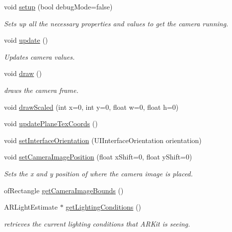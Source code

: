 \begin{DoxyCompactItemize}
void \mbox{\hyperlink{class_a_r_core_1_1_a_r_cam_a5abe4cdd0ae36986899afaeae16c6bf2}{setup}} (bool debug\+Mode=false)
\begin{DoxyCompactList}\small\item\em Sets up all the necessary properties and values to get the camera running. \end{DoxyCompactList}\item 
void \mbox{\hyperlink{class_a_r_core_1_1_a_r_cam_a900296e2ff23dfa7deb8bfab58fd0729}{update}} ()
\begin{DoxyCompactList}\small\item\em Updates camera values. \end{DoxyCompactList}\item 
void \mbox{\hyperlink{class_a_r_core_1_1_a_r_cam_ac6506992ee88e0acd20d851849ebfa18}{draw}} ()
\begin{DoxyCompactList}\small\item\em draws the camera frame. \end{DoxyCompactList}\item 
void \mbox{\hyperlink{class_a_r_core_1_1_a_r_cam_a5512aeae7ea9edb7daf9c9c07d15d402}{draw\+Scaled}} (int x=0, int y=0, float w=0, float h=0)
\item 
void \mbox{\hyperlink{class_a_r_core_1_1_a_r_cam_a577095ff1d35c84708f578d07df5ac33}{update\+Plane\+Tex\+Coords}} ()
\item 
void \mbox{\hyperlink{class_a_r_core_1_1_a_r_cam_ab4af1b504437a61f5ecec331ad2bd52c}{set\+Interface\+Orientation}} (U\+I\+Interface\+Orientation orientation)
\item 
void \mbox{\hyperlink{class_a_r_core_1_1_a_r_cam_ae287390a140e20f856c44988f706efa5}{set\+Camera\+Image\+Position}} (float x\+Shift=0, float y\+Shift=0)
\begin{DoxyCompactList}\small\item\em Sets the x and y position of where the camera image is placed. \end{DoxyCompactList}\item 
of\+Rectangle \mbox{\hyperlink{class_a_r_core_1_1_a_r_cam_abd6a08f527d91cb750b03ef12a52afe5}{get\+Camera\+Image\+Bounds}} ()
\item 
A\+R\+Light\+Estimate $\ast$ \mbox{\hyperlink{class_a_r_core_1_1_a_r_cam_ad11f88524d97445892956def3864523e}{get\+Lighting\+Conditions}} ()
\begin{DoxyCompactList}\small\item\em retrieves the current lighting conditions that A\+R\+Kit is seeing. \end{DoxyCompactList}\item 

\end{DoxyCompactItemize}
